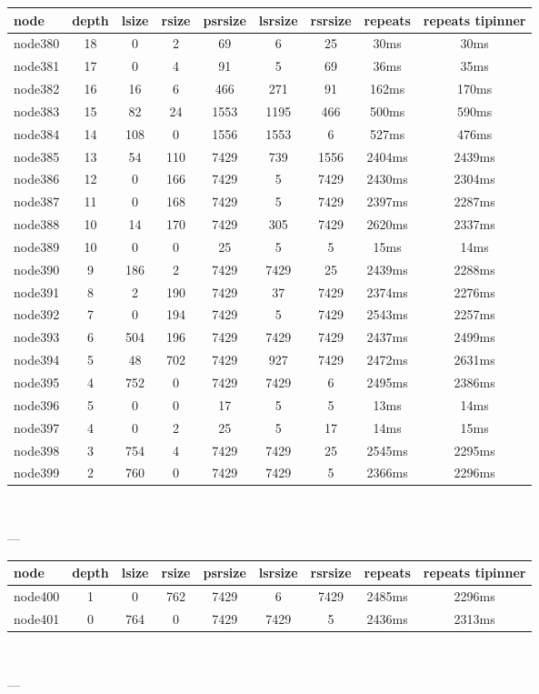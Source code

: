 \begin{tabular}{|l|c|c|c|c|c|c|c|c|}
\hline node & depth & lsize & rsize & psrsize & lsrsize & rsrsize   & repeats & repeats tipinner\\
    \hline node380 & 18 & 0 & 2 & 69 & 6 & 25 & 30ms & 30ms\\
    \hline node381 & 17 & 0 & 4 & 91 & 5 & 69 & 36ms & 35ms\\
    \hline node382 & 16 & 16 & 6 & 466 & 271 & 91 & 162ms & 170ms\\
    \hline node383 & 15 & 82 & 24 & 1553 & 1195 & 466 & 500ms & 590ms\\
    \hline node384 & 14 & 108 & 0 & 1556 & 1553 & 6 & 527ms & 476ms\\
    \hline node385 & 13 & 54 & 110 & 7429 & 739 & 1556 & 2404ms & 2439ms\\
    \hline node386 & 12 & 0 & 166 & 7429 & 5 & 7429 & 2430ms & 2304ms\\
    \hline node387 & 11 & 0 & 168 & 7429 & 5 & 7429 & 2397ms & 2287ms\\
    \hline node388 & 10 & 14 & 170 & 7429 & 305 & 7429 & 2620ms & 2337ms\\
    \hline node389 & 10 & 0 & 0 & 25 & 5 & 5 & 15ms & 14ms\\
    \hline node390 & 9 & 186 & 2 & 7429 & 7429 & 25 & 2439ms & 2288ms\\
    \hline node391 & 8 & 2 & 190 & 7429 & 37 & 7429 & 2374ms & 2276ms\\
    \hline node392 & 7 & 0 & 194 & 7429 & 5 & 7429 & 2543ms & 2257ms\\
    \hline node393 & 6 & 504 & 196 & 7429 & 7429 & 7429 & 2437ms & 2499ms\\
    \hline node394 & 5 & 48 & 702 & 7429 & 927 & 7429 & 2472ms & 2631ms\\
    \hline node395 & 4 & 752 & 0 & 7429 & 7429 & 6 & 2495ms & 2386ms\\
    \hline node396 & 5 & 0 & 0 & 17 & 5 & 5 & 13ms & 14ms\\
    \hline node397 & 4 & 0 & 2 & 25 & 5 & 17 & 14ms & 15ms\\
    \hline node398 & 3 & 754 & 4 & 7429 & 7429 & 25 & 2545ms & 2295ms\\
    \hline node399 & 2 & 760 & 0 & 7429 & 7429 & 5 & 2366ms & 2296ms\\

\hline
\end{tabular} \

---


\begin{tabular}{|l|c|c|c|c|c|c|c|c|}
\hline node & depth & lsize & rsize & psrsize & lsrsize & rsrsize   & repeats & repeats tipinner\\
    \hline node400 & 1 & 0 & 762 & 7429 & 6 & 7429 & 2485ms & 2296ms\\
    \hline node401 & 0 & 764 & 0 & 7429 & 7429 & 5 & 2436ms & 2313ms\\

\hline
\end{tabular} \

---

